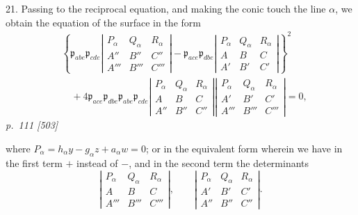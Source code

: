 \documentclass[11pt,a4paper]{article}
\newcommand{\sourcepage}[2]{%
  \bigskip
  \noindent\textit{p.~#1 [#2]}%
  \par\smallskip
}
\newcommand{\Det}[1]{\left|\begin{matrix}#1\end{matrix}\right|}
\newcommand{\p}{\mathfrak p}
\begin{document}
21. Passing to the reciprocal equation, and making the conic touch the line $\alpha$,
we obtain the equation of the surface in the form
\[
\begin{aligned}
&\left\{\p_{abe}\p_{cde}
\Det{P_\alpha&Q_\alpha&R_\alpha\\ A''&B''&C''\\A'''&B'''&C'''}
-\p_{ace}\p_{dbe}
\Det{P_\alpha&Q_\alpha&R_\alpha\\ A&B&C\\A'&B'&C'}\right\}^2\\
&\quad+4\p_{ace}\p_{dbe}\p_{abe}\p_{cde}
\Det{P_\alpha&Q_\alpha&R_\alpha\\ A&B&C\\A''&B''&C''}
\Det{P_\alpha&Q_\alpha&R_\alpha\\ A'&B'&C'\\A'''&B'''&C'''}=0,
\end{aligned}
\]
\sourcepage{111}{503}
where $P_\alpha=h_\alpha y-g_\alpha z+a_\alpha w=0$; or in the equivalent form
wherein we have in the first term $+$ instead of $-$, and in the second term the
determinants
\[
\Det{P_\alpha&Q_\alpha&R_\alpha\\A&B&C\\A'''&B'''&C'''},
\qquad
\Det{P_\alpha&Q_\alpha&R_\alpha\\A'&B'&C'\\A''&B''&C''}.
\]
\end{document}
